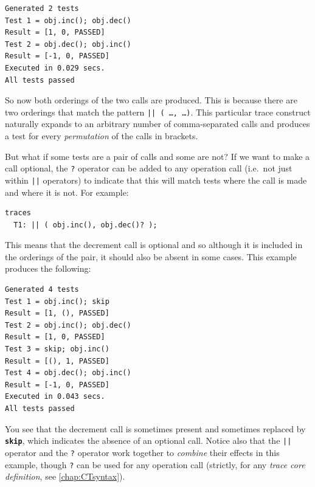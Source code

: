 \documentclass{overturerepchap}
\begin{document}
\small
\lstset{style=tool,language=}
\begin{lstlisting}[escapechar=@]
Generated 2 tests
Test 1 = obj.inc(); obj.dec()
Result = [1, 0, PASSED]
Test 2 = obj.dec(); obj.inc()
Result = [-1, 0, PASSED]
Executed in 0.029 secs. 
All tests passed
\end{lstlisting}
\lstset{style=mystyle}
\lstset{language=VDM++}
\normalsize

\noindent So now both orderings of the two calls are produced. This is because there are
two orderings that match the pattern \texttt{|| ( \ldots, \ldots )}. This
particular trace construct naturally expands to an arbitrary number of comma-separated
calls and produces a test for every \emph{permutation} of the calls in brackets.

But what if some tests are a pair of calls and some are not? If we want to make
a call optional, the \texttt{?} operator can be added to any operation call
(i.e.\ not just within \texttt{||} operators) to indicate that this will match
tests where the call is made and where it is not. For example:

\small
\begin{lstlisting}
traces
  T1: || ( obj.inc(), obj.dec()? );
\end{lstlisting}
\normalsize

\noindent This means that the decrement call is optional and so although it is included in
the orderings of the pair, it should also be absent in some cases. This
example produces the following:

\small
\lstset{style=tool,language=}
\begin{lstlisting}[escapechar=@]
Generated 4 tests
Test 1 = obj.inc(); skip
Result = [1, (), PASSED]
Test 2 = obj.inc(); obj.dec()
Result = [1, 0, PASSED]
Test 3 = skip; obj.inc()
Result = [(), 1, PASSED]
Test 4 = obj.dec(); obj.inc()
Result = [-1, 0, PASSED]
Executed in 0.043 secs. 
All tests passed
\end{lstlisting}
\lstset{style=mystyle}
\lstset{language=VDM++}
\normalsize

\noindent You see that the decrement call is sometimes present and sometimes replaced by
\texttt{\textbf{skip}}, which indicates the absence of an optional call. Notice also that
the \texttt{||} operator and the \texttt{?} operator work together to
\emph{combine} their effects in this example, though \texttt{?} can be used for
any operation call (strictly, for any \emph{trace core definition}, see
\ref{chap:CTsyntax}).
\end{document}

